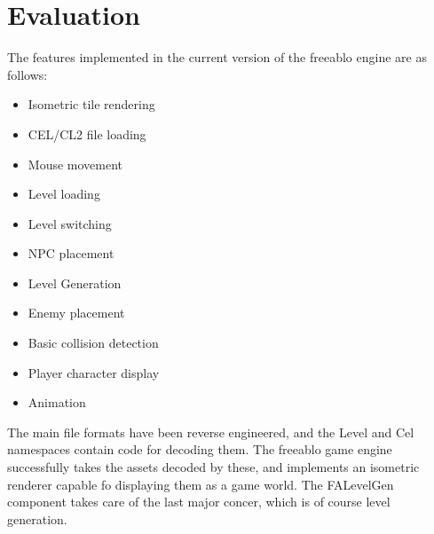 \chapter{Evaluation}
	The features implemented in the current version of the freeablo engine are as follows:\\
	\begin{itemize}
		\item{Isometric tile rendering}
		\item{CEL/CL2 file loading}
		\item{Mouse movement}
		\item{Level loading}
		\item{Level switching}
		\item{NPC placement}
		\item{Level Generation}
		\item{Enemy placement}
		\item{Basic collision detection}
		\item{Player character display}
		\item{Animation}
	\end{itemize}
	
	The main file formats have been reverse engineered, and the Level and Cel namespaces contain code for decoding them. The freeablo game engine successfully takes the assets decoded by these, and implements an isometric renderer capable fo displaying them as a game world. The FALevelGen component takes care of the last major concer, which is of course level generation.